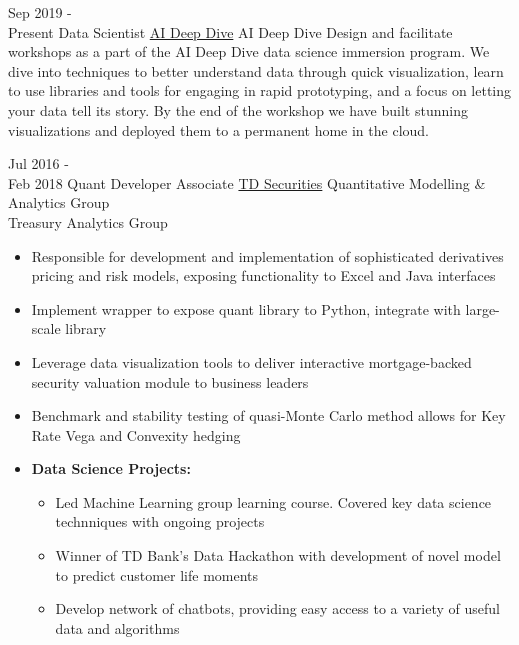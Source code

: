 \documentclass[letterpaper]{twentysecondcv} %
\begin{document}
\begin{twenty}
	\twentyitem
		{Sep 2019 - \\ Present}
		{Data Scientist}
		{\href{https://aideepdive.com/}{AI Deep Dive}}
		{AI Deep Dive}
		{}
		{Design and facilitate workshops as a part of the AI Deep Dive data science immersion program. We dive into techniques to better understand data through quick visualization, learn to use libraries and tools for engaging in rapid prototyping, and a focus on letting your data tell its story. By the end of the workshop we have built stunning visualizations and deployed them to a permanent home in the cloud.
		}	
	
	\twentyitem
    	{Jul 2016 - \\ Feb 2018}
        {Quant Developer Associate}
        {\href{https://www.tdsecurities.com}{TD Securities}}
        {Quantitative Modelling \& Analytics Group \\
        Treasury Analytics Group}
        {
        \item{}
        \item{}
        \item
		\item{}   
		\item
		\item{}
		\item{}     
		}
        {\begin{itemize}
        \item Responsible for development and implementation of sophisticated derivatives pricing and risk models, exposing functionality to Excel and Java interfaces
        \item Implement wrapper to expose quant library to Python, integrate with large-scale library
        \item Leverage data visualization tools to deliver interactive mortgage-backed security valuation module to business leaders
        \item Benchmark and stability testing of quasi-Monte Carlo method allows for Key Rate Vega and Convexity hedging   
		\item \textbf{Data Science Projects:}
		\begin{itemize}
        	\item Led Machine Learning group learning course. Covered key data science technniques with ongoing projects
       		\item Winner of TD Bank's Data Hackathon with development of novel model to predict customer life moments
        	\item Develop network of chatbots, providing easy access to a variety of useful data and algorithms
		\end{itemize}
    \end{itemize}	
    	}
        
\end{twenty}
\end{document}
